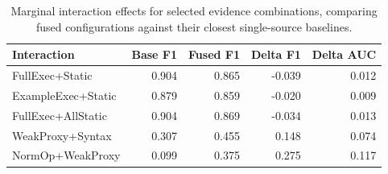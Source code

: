 \begin{table}[!htbp]
\centering
\scriptsize
\begin{tabular}{lrrrr}
\toprule
Interaction & Base F1 & Fused F1 & Delta F1 & Delta AUC \\
\midrule
FullExec+Static & 0.904 & 0.865 & -0.039 & 0.012 \\
ExampleExec+Static & 0.879 & 0.859 & -0.020 & 0.009 \\
FullExec+AllStatic & 0.904 & 0.869 & -0.034 & 0.013 \\
WeakProxy+Syntax & 0.307 & 0.455 & 0.148 & 0.074 \\
NormOp+WeakProxy & 0.099 & 0.375 & 0.275 & 0.117 \\
\bottomrule
\end{tabular}
\vspace{0.5em}
\caption{Marginal interaction effects for selected evidence combinations, comparing fused configurations against their closest single-source baselines.}
\label{tab:evidence-interactions}
\end{table}
